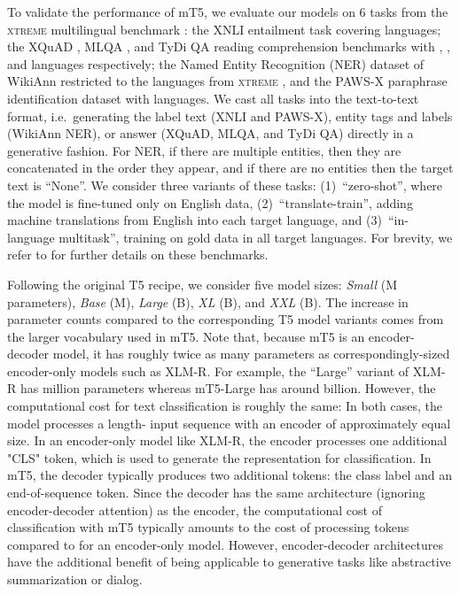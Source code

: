 \documentclass[11pt]{article}
\begin{document}
To validate the performance of mT5, we evaluate our models on 6 tasks from the \textsc{xtreme} multilingual benchmark \citep{hu2020xtreme}: the XNLI \citep{conneau2018xnli} entailment task covering  languages; the XQuAD \citep{Artetxe:etal:2019}, MLQA \citep{lewis2019mlqa}, and TyDi QA \citep{tydiqa} reading comprehension benchmarks with , , and  languages respectively;
the Named Entity Recognition (NER) dataset of WikiAnn \citep{pan2017cross} restricted to the  languages from \textsc{xtreme} \citep{hu2020xtreme}, and the \mbox{PAWS-X} \citep{yang2019paws} paraphrase identification dataset with  languages.
We cast all tasks into the text-to-text format, i.e.\ generating the label text (XNLI and \mbox{PAWS-X}), entity tags and labels (WikiAnn NER), or answer (XQuAD, MLQA, and TyDi QA) directly in a generative fashion.
For NER, if there are multiple entities, then they are concatenated in the order they appear, and if there are no entities then the target text is ``None''.
We consider three variants of these tasks: (1)~``zero-shot'', where the model is fine-tuned only on English data, (2)~``translate-train'', adding machine translations from English into each target language, and (3)~``in-language multitask'', training on gold data in all target languages.
For brevity, we refer to \citet{hu2020xtreme} for further details on these benchmarks.

Following the original T5 recipe, we consider five model sizes: \textit{Small} (M parameters), \textit{Base} (M), \textit{Large} (B), \textit{XL} (B), and \textit{XXL} (B).
The increase in parameter counts compared to the corresponding T5 model variants comes from the larger vocabulary used in mT5.
Note that, because mT5 is an encoder-decoder model, it has roughly twice as many parameters as correspondingly-sized encoder-only models such as XLM-R.
For example, the ``Large'' variant of XLM-R has  million parameters whereas mT5-Large has around  billion. 
However, the computational cost for text classification is roughly the same:
In both cases, the model processes a length- input sequence with an encoder of approximately equal size.
In an encoder-only model like XLM-R, the encoder processes one additional "CLS" token, which is used to generate the representation for classification.
In mT5, the decoder typically produces two additional tokens: the class label and an end-of-sequence token.
Since the decoder has the same architecture (ignoring encoder-decoder attention) as the encoder, the computational cost of classification with mT5 typically amounts to the cost of processing  tokens compared to  for an encoder-only model.
However, encoder-decoder architectures have the additional benefit of being applicable to generative tasks like abstractive summarization or dialog.
\end{document}
